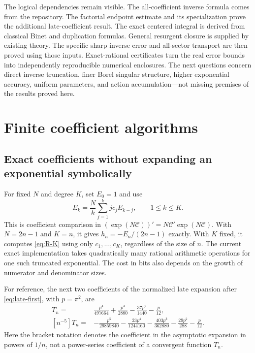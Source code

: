 \documentclass[11pt,a4paper]{article}
\theoremstyle{definition}
\numberwithin{equation}{section}
\newcommand{\cformal}{\mathscr C}
\begin{document}
The logical dependencies remain visible. The all-coefficient inverse formula comes from the repository. The factorial endpoint estimate and its specialization prove the additional late-coefficient result. The exact centered integral is derived from classical Binet and duplication formulas. General resurgent closure is supplied by existing theory. The specific sharp inverse error and all-sector transport are then proved using those inputs. Exact-rational certificates turn the real error bounds into independently reproducible numerical enclosures. The next questions concern direct inverse truncation, finer Borel singular structure, higher exponential accuracy, uniform parameters, and action accumulation---not missing premises of the results proved here.

\appendix
\section{Finite coefficient algorithms}
\label{app:algorithms}

\subsection{Exact coefficients without expanding an exponential symbolically}
For fixed $N$ and degree $K$, set $E_0=1$ and use
\begin{equation}
 E_k=\frac Nk\sum_{j=1}^k j c_jE_{k-j},\qquad 1\le k\le K.
 \label{eq:E-recurrence}
\end{equation}
This is coefficient comparison in $(\exp(N\cformal))'=N\cformal'\exp(N\cformal)$. With $N=2n-1$ and $K=n$, it gives $h_n=-E_n/(2n-1)$ exactly. With $K$ fixed, it computes \eqref{eq:R-K} using only $c_1,\ldots,c_K$, regardless of the size of $n$. The current exact implementation takes quadratically many rational arithmetic operations for one such truncated exponential. The cost in bits also depends on the growth of numerator and denominator sizes.

For reference, the next two coefficients of the normalized late expansion after \eqref{eq:late-first}, with $p=\pi^2$, are
\begin{align}
 [n^{-4}]T_n={}&\frac{p^4}{497664}+\frac{p^3}{2880}
                   -\frac{37p^2}{1440}-\frac p{12},\label{eq:late-four}\\
 [n^{-5}]T_n={}&-\frac{p^5}{29859840}-\frac{23p^4}{1244160}
                   -\frac{403p^3}{362880}-\frac{29p^2}{288}-\frac p{12}.
 \label{eq:late-five}
\end{align}
Here the bracket notation denotes the coefficient in the asymptotic expansion in powers of $1/n$, not a power-series coefficient of a convergent function $T_n$.
\end{document}
